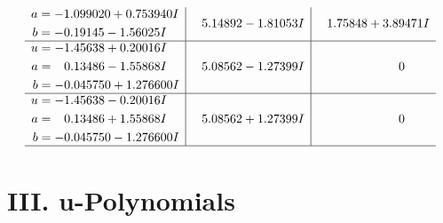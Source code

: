 \documentclass[1p]{elsarticle_modified}
\theoremstyle{definition}
\begin{document}
$$\begin{array}{c|c|c}
\begin{aligned}
a &= -1.099020 + 0.753940 I \\
b &= -0.19145 - 1.56025 I\end{aligned}
 & \phantom{-}5.14892 - 1.81053 I & \phantom{-}1.75848 + 3.89471 I \\ \hline\begin{aligned}
u &= -1.45638 + 0.20016 I \\
a &= \phantom{-}0.13486 - 1.55868 I \\
b &= -0.045750 + 1.276600 I\end{aligned}
 & \phantom{-}5.08562 - 1.27399 I & \phantom{-0.000000 } 0 \\ \hline\begin{aligned}
u &= -1.45638 - 0.20016 I \\
a &= \phantom{-}0.13486 + 1.55868 I \\
b &= -0.045750 - 1.276600 I\end{aligned}
 & \phantom{-}5.08562 + 1.27399 I & \phantom{-0.000000 } 0\\
 \hline 
 \end{array}$$\newpage
\newpage\renewcommand{\arraystretch}{1}
\centering \section*{ III. u-Polynomials}
\end{document}
